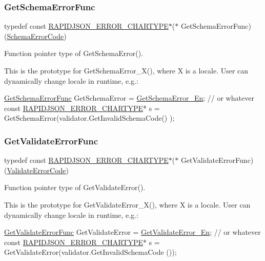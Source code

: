 \subsubsection{\texorpdfstring{Get\+Schema\+Error\+Func}{GetSchemaErrorFunc}}
{\footnotesize\ttfamily typedef const \hyperlink{group__RAPIDJSON__ERRORS_ga7e4636fd48d0148f102b8a13f0539d8c}{R\+A\+P\+I\+D\+J\+S\+O\+N\+\_\+\+E\+R\+R\+O\+R\+\_\+\+C\+H\+A\+R\+T\+Y\+PE}$\ast$($\ast$ Get\+Schema\+Error\+Func) (\hyperlink{group__RAPIDJSON__ERRORS_ga64f496d2cee8c9673f3105ec6008f290}{Schema\+Error\+Code})}



Function pointer type of Get\+Schema\+Error(). 

This is the prototype for {\ttfamily Get\+Schema\+Error\+\_\+\+X()}, where {\ttfamily X} is a locale. User can dynamically change locale in runtime, e.\+g.\+: 
\begin{DoxyCode}
\hyperlink{group__RAPIDJSON__ERRORS_ga27925387f15027c190cfd8411c4a3535}{GetSchemaErrorFunc} GetSchemaError = \hyperlink{group__RAPIDJSON__ERRORS_ga14d079416a08527108f622b197061540}{GetSchemaError\_En}; \textcolor{comment}{// or whatever}
\textcolor{keyword}{const} \hyperlink{group__RAPIDJSON__ERRORS_ga7e4636fd48d0148f102b8a13f0539d8c}{RAPIDJSON\_ERROR\_CHARTYPE}* s = GetSchemaError(validator.GetInvalidSchemaCode()
      );
\end{DoxyCode}
 \mbox{\label{group__RAPIDJSON__ERRORS_ga9e966925692da858e85ecf5c44fe8d38}} 
\subsubsection{\texorpdfstring{Get\+Validate\+Error\+Func}{GetValidateErrorFunc}}
{\footnotesize\ttfamily typedef const \hyperlink{group__RAPIDJSON__ERRORS_ga7e4636fd48d0148f102b8a13f0539d8c}{R\+A\+P\+I\+D\+J\+S\+O\+N\+\_\+\+E\+R\+R\+O\+R\+\_\+\+C\+H\+A\+R\+T\+Y\+PE}$\ast$($\ast$ Get\+Validate\+Error\+Func) (\hyperlink{group__RAPIDJSON__ERRORS_ga2e1f88f94a5d9a6817a5de0ed2f0105a}{Validate\+Error\+Code})}



Function pointer type of Get\+Validate\+Error(). 

This is the prototype for {\ttfamily Get\+Validate\+Error\+\_\+\+X()}, where {\ttfamily X} is a locale. User can dynamically change locale in runtime, e.\+g.\+: 
\begin{DoxyCode}
\hyperlink{group__RAPIDJSON__ERRORS_ga9e966925692da858e85ecf5c44fe8d38}{GetValidateErrorFunc} GetValidateError = \hyperlink{group__RAPIDJSON__ERRORS_gade9d7778693290f23a627630c73e6edf}{GetValidateError\_En}; \textcolor{comment}{// or
       whatever}
\textcolor{keyword}{const} \hyperlink{group__RAPIDJSON__ERRORS_ga7e4636fd48d0148f102b8a13f0539d8c}{RAPIDJSON\_ERROR\_CHARTYPE}* s = GetValidateError(validator.GetInvalidSchemaCode
      ());
\end{DoxyCode}
 

